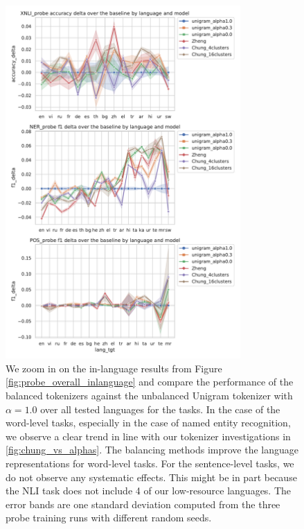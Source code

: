 \begin{figure}[H]
    \centering
    \includegraphics[width=0.8\textwidth]{figures/probe_detailed_inlanguage_over_baseline.pdf}
    \caption{We zoom in on the in-language results from Figure \ref{fig:probe_overall_inlanguage} and compare the performance of the balanced tokenizers against the unbalanced Unigram tokenizer with $\alpha=1.0$ over all tested languages for the tasks. In the case of the word-level tasks, especially in the case of named entity recognition, we observe a clear trend in line with our tokenizer investigations in \ref{fig:chung_vs_alphas}. The balancing methods improve the language representations for word-level tasks. For the sentence-level tasks, we do not observe any systematic effects. This might be in part because the NLI task does not include 4 of our low-resource languages. The error bands are one standard deviation computed from the three probe training runs with different random seeds.}
    \label{fig:probe_overall_inlanguage_over_baseline}
\end{figure}


